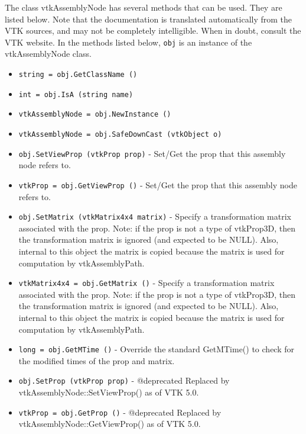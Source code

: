 The class vtkAssemblyNode has several methods that can be used.
  They are listed below.
Note that the documentation is translated automatically from the VTK sources,
and may not be completely intelligible.  When in doubt, consult the VTK website.
In the methods listed below, \verb|obj| is an instance of the vtkAssemblyNode class.
\begin{itemize}
\item  \verb|string = obj.GetClassName ()|

\item  \verb|int = obj.IsA (string name)|

\item  \verb|vtkAssemblyNode = obj.NewInstance ()|

\item  \verb|vtkAssemblyNode = obj.SafeDownCast (vtkObject o)|

\item  \verb|obj.SetViewProp (vtkProp prop)| -  Set/Get the prop that this assembly node refers to.

\item  \verb|vtkProp = obj.GetViewProp ()| -  Set/Get the prop that this assembly node refers to.

\item  \verb|obj.SetMatrix (vtkMatrix4x4 matrix)| -  Specify a transformation matrix associated with the prop.
 Note: if the prop is not a type of vtkProp3D, then the
 transformation matrix is ignored (and expected to be NULL).
 Also, internal to this object the matrix is copied because
 the matrix is used for computation by vtkAssemblyPath.

\item  \verb|vtkMatrix4x4 = obj.GetMatrix ()| -  Specify a transformation matrix associated with the prop.
 Note: if the prop is not a type of vtkProp3D, then the
 transformation matrix is ignored (and expected to be NULL).
 Also, internal to this object the matrix is copied because
 the matrix is used for computation by vtkAssemblyPath.

\item  \verb|long = obj.GetMTime ()| -  Override the standard GetMTime() to check for the modified times
 of the prop and matrix.

\item  \verb|obj.SetProp (vtkProp prop)| -  @deprecated Replaced by vtkAssemblyNode::SetViewProp() as of VTK 5.0.

\item  \verb|vtkProp = obj.GetProp ()| -  @deprecated Replaced by vtkAssemblyNode::GetViewProp() as of VTK 5.0.

\end{itemize}
